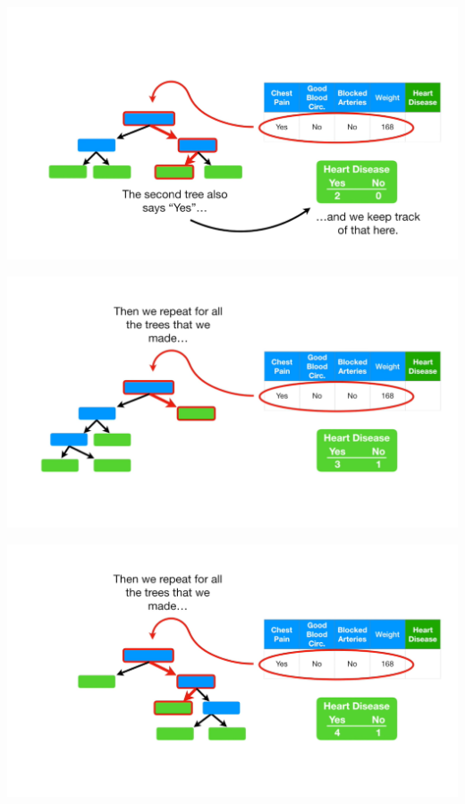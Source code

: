 \documentclass[
  ignorenonframetext,
]{beamer}
\begin{document}
\begin{frame}{}
\protect\hypertarget{section-56}{}
\includegraphics{images/r57.png}
\end{frame}

\begin{frame}{}
\protect\hypertarget{section-57}{}
\includegraphics{images/r58.png}
\end{frame}

\begin{frame}{}
\protect\hypertarget{section-58}{}
\includegraphics{images/r59.png}
\end{frame}
\end{document}
